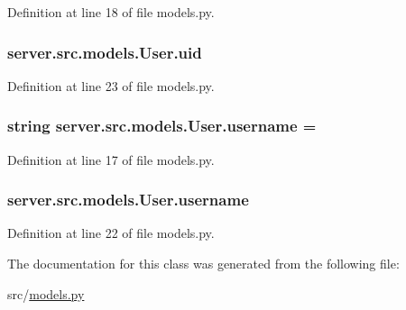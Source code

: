 Definition at line 18 of file models.\+py.

\subsubsection[{\texorpdfstring{uid}{uid}}]{\setlength{\rightskip}{0pt plus 5cm}server.\+src.\+models.\+User.\+uid}\hypertarget{classserver_1_1src_1_1models_1_1_user_a3c77fa137fbf4878442d55a49909fa1b}{}\label{classserver_1_1src_1_1models_1_1_user_a3c77fa137fbf4878442d55a49909fa1b}


Definition at line 23 of file models.\+py.

\subsubsection[{\texorpdfstring{username}{username}}]{\setlength{\rightskip}{0pt plus 5cm}string server.\+src.\+models.\+User.\+username = \textquotesingle{}\textquotesingle{}\hspace{0.3cm}{\ttfamily [static]}}\hypertarget{classserver_1_1src_1_1models_1_1_user_acb75051a64b473f00340abd8d8cd379a}{}\label{classserver_1_1src_1_1models_1_1_user_acb75051a64b473f00340abd8d8cd379a}


Definition at line 17 of file models.\+py.

\subsubsection[{\texorpdfstring{username}{username}}]{\setlength{\rightskip}{0pt plus 5cm}server.\+src.\+models.\+User.\+username}\hypertarget{classserver_1_1src_1_1models_1_1_user_a8ff12934f8cd0b6ff62cc6fd926f8e65}{}\label{classserver_1_1src_1_1models_1_1_user_a8ff12934f8cd0b6ff62cc6fd926f8e65}


Definition at line 22 of file models.\+py.



The documentation for this class was generated from the following file\+:\begin{DoxyCompactItemize}
\item 
src/\hyperlink{models_8py}{models.\+py}\end{DoxyCompactItemize}
